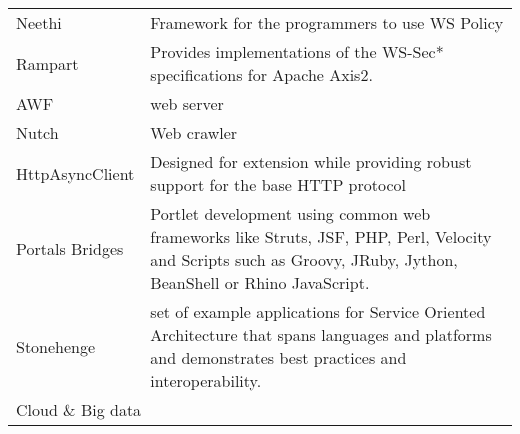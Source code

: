 {\begin{longtable}{|p{2cm} | p{14cm}|}
\\ Neethi & Framework for the programmers to use WS Policy
\\ Rampart & Provides implementations of the WS-Sec* specifications for Apache Axis2.
\\ AWF & web server
\\ Nutch & Web crawler
\\ HttpAsyncClient & Designed for extension while providing robust support for the base HTTP protocol
\\ Portals Bridges & Portlet development using common web frameworks like Struts, JSF, PHP, Perl, Velocity and Scripts such as Groovy, JRuby, Jython, BeanShell or Rhino JavaScript.
\\ Stonehenge & set of example applications for Service Oriented Architecture that spans languages and platforms and demonstrates best practices and interoperability. \\


\hline
\multicolumn{2}{|l|}{Cloud \& Big data} \\
\hline


\end{longtable}}
